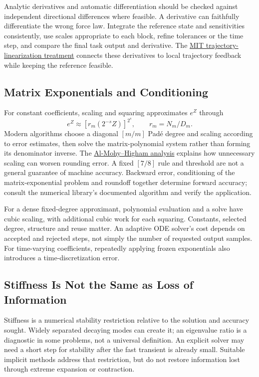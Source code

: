 Analytic derivatives and automatic differentiation should be checked against independent directional differences where feasible. A derivative can faithfully differentiate the wrong force law. Integrate the reference state and sensitivities consistently, use scales appropriate to each block, refine tolerances or the time step, and compare the final task output and derivative. The \href{https://underactuated.mit.edu/lqr.html}{MIT trajectory-linearization treatment} connects these derivatives to local trajectory feedback while keeping the reference feasible.

\subsection{Matrix Exponentials and Conditioning}

For constant coefficients, scaling and squaring approximates $e^Z$ through
\begin{equation}
e^Z\approx\left[r_m(2^{-s}Z)\right]^{2^s},
\qquad r_m=N_m/D_m.
\end{equation}
Modern algorithms choose a diagonal $[m/m]$ Padé degree and scaling according to error estimates, then solve the matrix-polynomial system rather than forming its denominator inverse. The \href{https://doi.org/10.1137/09074721X}{Al-Mohy--Higham analysis} explains how unnecessary scaling can worsen rounding error. A fixed $[7/8]$ rule and threshold are not a general guarantee of machine accuracy. Backward error, conditioning of the matrix-exponential problem and roundoff together determine forward accuracy; consult the numerical library's documented algorithm and verify the application.

For a dense fixed-degree approximant, polynomial evaluation and a solve have cubic scaling, with additional cubic work for each squaring. Constants, selected degree, structure and reuse matter. An adaptive ODE solver's cost depends on accepted and rejected steps, not simply the number of requested output samples. For time-varying coefficients, repeatedly applying frozen exponentials also introduces a time-discretization error.

\subsection{Stiffness Is Not the Same as Loss of Information}
\label{sec:ch2:stability}

Stiffness is a numerical stability restriction relative to the solution and accuracy sought. Widely separated decaying modes can create it; an eigenvalue ratio is a diagnostic in some problems, not a universal definition. An explicit solver may need a short step for stability after the fast transient is already small. Suitable implicit methods address that restriction, but do not restore information lost through extreme expansion or contraction.

